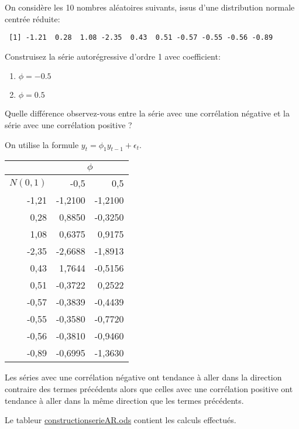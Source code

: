 \begin{exercice}
  On considère les 10 nombres aléatoires suivants, issus d'une distribution normale centrée réduite:

\begin{verbatim}
 [1] -1.21  0.28  1.08 -2.35  0.43  0.51 -0.57 -0.55 -0.56 -0.89
\end{verbatim}

Construisez la série autorégressive d'ordre 1 avec coefficient: 
\begin{enumerate}
\item $\phi = -0.5$
\item $\phi = 0.5$
\end{enumerate}

Quelle différence observez-vous entre la série avec une corrélation négative et la série avec une corrélation positive ?
\begin{sol}
  On utilise la formule $y_t = \phi_1y_{t-1} + \epsilon_t$.

\begin{center}
\begin{tabular}{|r|r|r|}
\hline
\multicolumn{1}{|l|}{} & \multicolumn{ 2}{c|}{$\phi$} \\ \hline
\multicolumn{1}{|l|}{$N(0,1)$} & -0,5 & 0,5 \\ \hline
-1,21 & -1,2100 & -1,2100 \\ \hline
0,28 & 0,8850 & -0,3250 \\ \hline
1,08 & 0,6375 & 0,9175 \\ \hline
-2,35 & -2,6688 & -1,8913 \\ \hline
0,43 & 1,7644 & -0,5156 \\ \hline
0,51 & -0,3722 & 0,2522 \\ \hline
-0,57 & -0,3839 & -0,4439 \\ \hline
-0,55 & -0,3580 & -0,7720 \\ \hline
-0,56 & -0,3810 & -0,9460 \\ \hline
-0,89 & -0,6995 & -1,3630 \\ \hline
\end{tabular}
\end{center}

Les séries avec une corrélation négative ont tendance à aller dans la direction contraire des termes précédents alors que celles avec une corrélation positive ont tendance à aller dans la même direction que les termes précédents.

Le tableur \url{constructionserieAR.ods} contient les calculs effectués.
\end{sol}
\end{exercice}

